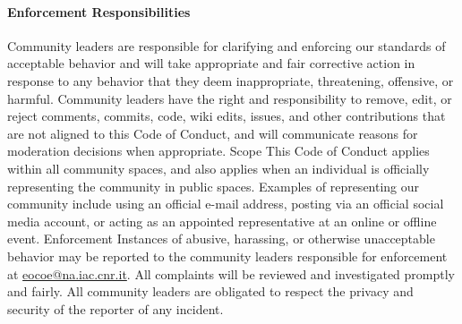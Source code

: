 \paragraph{Enforcement Responsibilities}
Community leaders are responsible for clarifying and enforcing our standards of
acceptable behavior and will take appropriate and fair corrective action in
response to any behavior that they deem inappropriate, threatening, offensive,
or harmful.
Community leaders have the right and responsibility to remove, edit, or reject
comments, commits, code, wiki edits, issues, and other contributions that are
not aligned to this Code of Conduct, and will communicate reasons for moderation
decisions when appropriate.
Scope
This Code of Conduct applies within all community spaces, and also applies when
an individual is officially representing the community in public spaces.
Examples of representing our community include using an official e-mail address,
posting via an official social media account, or acting as an appointed
representative at an online or offline event.
Enforcement
Instances of abusive, harassing, or otherwise unacceptable behavior may be
reported to the community leaders responsible for enforcement at
\href{mailto:eocoe@na.iac.cnr.it}{eocoe@na.iac.cnr.it}.
All complaints will be reviewed and investigated promptly and fairly.
All community leaders are obligated to respect the privacy and security of the
reporter of any incident.

